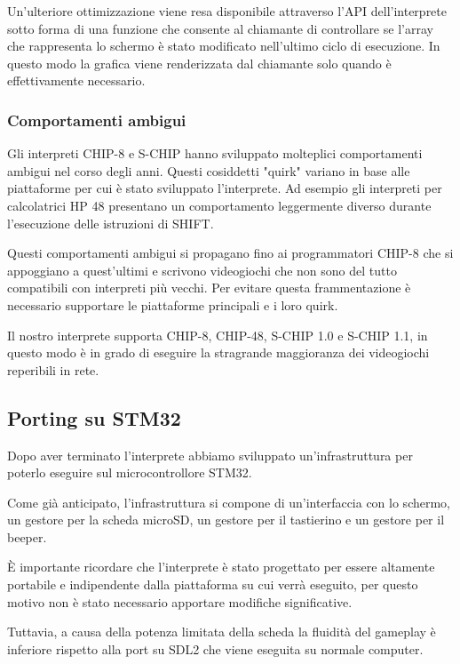 \documentclass[a4paper]{article}
\begin{document}
Un'ulteriore ottimizzazione viene resa disponibile attraverso l'API
dell'interprete sotto forma di una funzione che consente al chiamante
di controllare se l'array che rappresenta lo schermo è stato
modificato nell'ultimo ciclo di esecuzione. In questo modo la grafica
viene renderizzata dal chiamante solo quando è effettivamente
necessario.

\subsubsection{Comportamenti ambigui}

Gli interpreti CHIP-8 e S-CHIP hanno sviluppato molteplici
comportamenti ambigui nel corso degli anni. Questi cosiddetti
"quirk" variano in base alle piattaforme per cui è stato sviluppato
l'interprete. Ad esempio gli interpreti per calcolatrici HP 48
presentano un comportamento leggermente diverso durante l'esecuzione
delle istruzioni di SHIFT.

Questi comportamenti ambigui si propagano fino ai programmatori
CHIP-8 che si appoggiano a quest'ultimi e scrivono videogiochi che
non sono del tutto compatibili con interpreti più vecchi. Per evitare
questa frammentazione è necessario supportare le piattaforme
principali e i loro quirk.

Il nostro interprete supporta CHIP-8, CHIP-48, S-CHIP 1.0 e
S-CHIP 1.1, in questo modo è in grado di eseguire la stragrande
maggioranza dei videogiochi reperibili in rete.

\subsection{Porting su STM32}

Dopo aver terminato l'interprete abbiamo sviluppato un'infrastruttura per poterlo eseguire
sul microcontrollore STM32.

Come già anticipato, l'infrastruttura si compone di un'interfaccia con lo schermo,
un gestore per la scheda microSD, un gestore per il tastierino e un gestore per il beeper.

È importante ricordare che l'interprete è stato progettato per essere altamente portabile
e indipendente dalla piattaforma su cui verrà eseguito, per questo motivo non è stato necessario
apportare modifiche significative.

Tuttavia, a causa della potenza limitata della scheda la fluidità del gameplay è inferiore
rispetto alla port su SDL2 che viene eseguita su normale computer.
\end{document}
